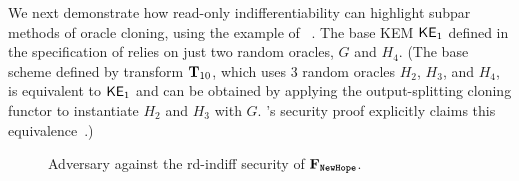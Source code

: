 
We next demonstrate how read-only indifferentiability can highlight subpar methods of oracle cloning, using the example of ~\cite{nistpqc:NewHope}.
The base KEM ${\mathsf{KE}}_1$ defined in the specification of  relies on just two random oracles, $G$ and $H_4$. (The base scheme defined by transform $\mathbf{T}_{10}$, which uses 3 random oracles $H_2$, $H_3$, and $H_4$, is equivalent to ${\mathsf{KE}}_1$ and can be obtained by applying the output-splitting cloning functor to instantiate $H_2$ and $H_3$ with $G$. 's security proof explicitly claims this equivalence~\cite{nistpqc:NewHope}.)

\begin{figure}[t]
	\caption{Adversary against the rd-indiff security of $\construct{F}_{\pqcnameRoundTwo{NewHope}}$.}
	\label{fig-newhope-adv}
	\hrulefill
\end{figure}

